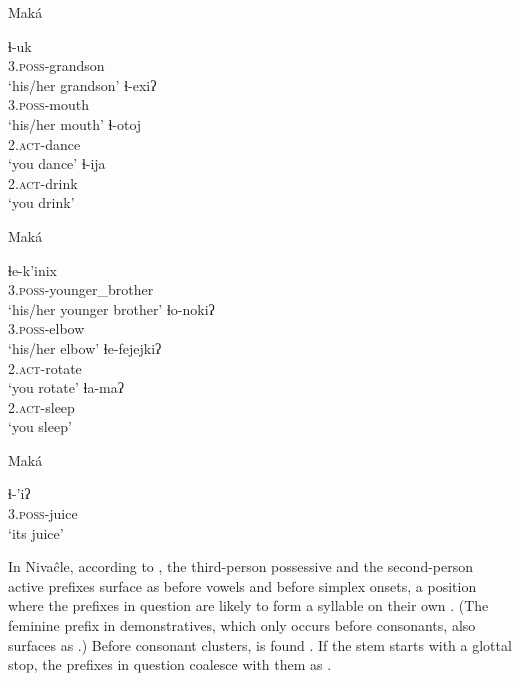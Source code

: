 \ea\label{ex:sylllh:1:mak}
    Maká \citep[85, 91, 148]{AG94}
    \begin{xlist}
        \ex\gll ɬ-uk\\
                3.{\textsc{poss}}-grandson\\
                \glt `his/her grandson'
        \ex\gll ɬ-exiʔ\\
                3.{\textsc{poss}}-mouth\\
                \glt `his/her mouth'
        \ex\gll ɬ-otoj\\
                2.{\textsc{act}}-dance\\
                \glt `you dance'
        \ex\gll ɬ-ija\\
                2.{\textsc{act}}-drink\\
                \glt `you drink'
    \end{xlist}
\z

\ea\label{ex:sylllh:2:mak}
    Maká \citep[85, 88, 148]{AG94}
    \begin{xlist}
        \ex\gll ɬe-k’inix\\
                3.{\textsc{poss}}-younger\_brother\\
                \glt `his/her younger brother'
        \ex\gll ɬo-nokiʔ\\
                3.{\textsc{poss}}-elbow\\
                \glt `his/her elbow'
        \ex\gll ɬe-fejejkiʔ\\
                2.{\textsc{act}}-rotate\\
                \glt `you rotate'
        \ex\gll ɬa-maʔ\\
                2.{\textsc{act}}-sleep\\
                \glt `you sleep'
    \end{xlist}
\z

\ea\label{ex:sylllh:3:mak}
    Maká \citep[68]{AG94}
    \begin{xlist}
        \ex\gll ɬ-’iʔ\\
                3.{\textsc{poss}}-juice\\
                \glt `its juice'
    \end{xlist}
\z

In Nivaĉle, according to \citet[59, 62, 230--231]{AnG15}, the third-person possessive and the second-person active prefixes surface as  before vowels  and before simplex onsets, a position where the prefixes in question are likely to form a syllable on their own . (The feminine prefix in demonstratives, which only occurs before consonants, also surfaces as .) Before consonant clusters,  is found . If the stem starts with a glottal stop, the prefixes in question coalesce with them as  .


